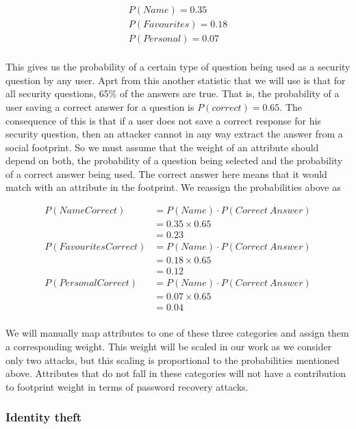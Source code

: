 \documentclass[10pt,conference]{IEEEtran}
\begin{document}
\begin{align*}
P(Name) = 0.35 \\
P(Favourites) = 0.18 \\
P(Personal) = 0.07 \\
\end{align*}

This gives us the probability of a certain type of question being used as a security question by any user. Aprt from this another statistic that we will use is that for all security questions, 65\% of the answers are true. That is, the probability of a user saving a correct answer for a question is $ P(correct) = 0.65 $. The consequence of this is that if a user does not save a correct response for his security question, then an attacker cannot in any way extract the answer from a social footprint. So we must assume that the weight of an attribute should depend on both, the probability of a question being selected and the probability of a correct answer being used. The correct answer here means that it would match with an attribute in the footprint. We reassign the probabilities above as 

\begin{align*}
P(Name Correct)       &= P(Name) \cdot P(Correct\ Answer) \\ 
			       &= 0.35 \times 0.65 \\
			       &= 0.23 \\
P(Favourites Correct) &= P(Name) \cdot P(Correct\ Answer) \\ 
			       &= 0.18 \times 0.65 \\
			       &= 0.12 \\
P(Personal Correct)   &= P(Name) \cdot P(Correct\ Answer) \\ 
			       &= 0.07 \times 0.65 \\
			       &= 0.04 \\
\end{align*}

We will manually map attributes to one of these three categories and assign them a corresponding weight. This weight will be scaled in our work as we consider only two attacks, but this scaling is proportional to the probabilities mentioned above. Attributes that do not fall in these categories will not have a contribution to footprint weight in terms of password recovery attacks. 

\subsubsection{Identity theft}
\end{document}
